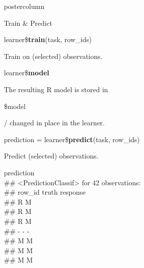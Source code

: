 \documentclass{beamer}
\newcommand{\codeinline}[1]{\begin{codeboxinline}#1\end{codeboxinline}}
\begin{document}
\begin{frame}[fragile]{}
\begin{columns}
\begin{column}{.245\textwidth}
\begin{beamercolorbox}[center]{postercolumn}
\begin{minipage}{.98\textwidth}
{						\begin{myblock}{Train \& Predict}
							\vspace{0.25em}
							\begin{codebox}
								learner\$\textbf{train}(task, row\_ids)
							\end{codebox}
	                        Train on (selected) observations. 
	   						\\
							\begin{codebox}
								learner\$\textbf{model}
							\end{codebox}
							The resulting R model is stored in \codeinline{\$model}/ changed in place in the learner.
							\\
							\vspace{1em} %
							\begin{codebox}
								prediction = learner\$\textbf{predict}(task, row\_ids)
							\end{codebox}
	                        Predict (selected) observations.
	                        \\
	                        \begin{codeboxmultiline}[width=23cm]
								{\footnotesize prediction\\
								\#\# <PredictionClassif> for 42 observations:\\
								\#\# row\_id truth response\\
								\#\# \space\space\space\space\space 2
								\space\space\space\space R \space\space\space\space\space\space\space M\\
								\#\# \space\space\space\space\space 3
								\space\space\space\space R \space\space\space\space\space\space\space M\\
								\#\# \space\space\space\space\space 5
								\space\space\space\space R \space\space\space\space\space\space\space M\\
								\#\# - - -\\
								\#\# \space\space\space 198
								\space\space\space\space M \space\space\space\space\space\space\space M\\
								\#\# \space\space{}00
								\space\space\space\space M \space\space\space\space\space\space\space M\\
								\#\# \space\space\space 207
								\space\space\space\space M \space\space\space\space\space\space\space M}
	                        \end{codeboxmultiline}
							\vspace{1em}

\end{myblock}}
\end{minipage}
\end{beamercolorbox}
\end{column}
\end{columns}
\end{frame}
\end{document}
